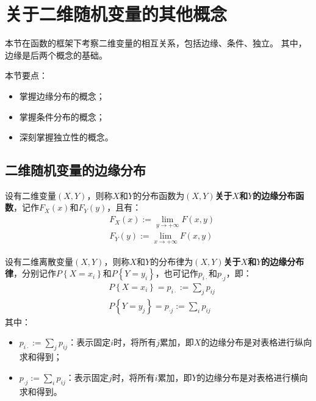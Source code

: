 \section{关于二维随机变量的其他概念}

本节在函数的框架下考察二维变量的相互关系，包括边缘、条件、独立。
其中，边缘是后两个概念的基础。

本节要点：
\begin{itemize}
    \item 掌握边缘分布的概念；
    \item 掌握条件分布的概念；
    \item 深刻掌握独立性的概念。
\end{itemize}

\subsection{二维随机变量的边缘分布}

\begin{definition}[边缘分布函数]
设有二维变量$\left( X,Y \right) $，则称$X$和$Y$的分布函数为{\bf $\left( X,Y \right) $关于$X$和$Y$的边缘分布函数}，记作$F_X\left( x \right) $和$F_Y\left( y \right) $，且有：
\begin{align*}
&F_X\left( x \right) :=\underset{y\rightarrow +\infty}{\lim}F\left( x,y \right) \\
&F_Y\left( y \right) :=\underset{x\rightarrow +\infty}{\lim}F\left( x,y \right)
\end{align*}
\end{definition}

\begin{definition}[边缘分布率]
设有二维离散变量$\left( X,Y \right) $，则称$X$和$Y$的分布律为{\bf $\left( X,Y \right) $关于$X$和$Y$的边缘分布律}，分别记作$P\left\{ X=x_i \right\} $和$P\left\{ Y=y_i \right\} $，也可记作$p_{i\cdot}$和$p_{\cdot j}$，即：
\begin{align*}
&P\left\{ X=x_i \right\} =p_{i\cdot}:=\sum_j{p_{ij}} \\
&P\left\{ Y=y_j \right\} =p_{\cdot j}:=\sum_i{p_{ij}}
\end{align*}
其中：
\begin{itemize}
    \item $p_{i\cdot}:=\sum_j{p_{ij}}$：表示固定$i$时，将所有$j$累加，即$X$的边缘分布是对表格进行纵向求和得到；
    \item $p_{\cdot j}:=\sum_i{p_{ij}}$：表示固定$j$时，将所有$i$累加，即$Y$的边缘分布是对表格进行横向求和得到。
\end{itemize}
\end{definition}

